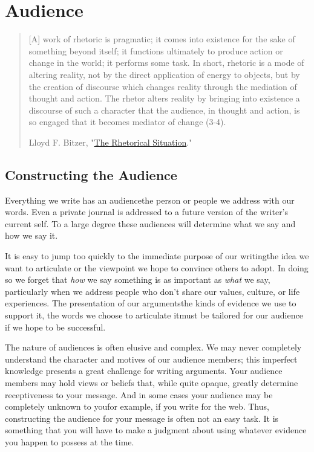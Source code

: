 \hypertarget{audience}{}

\chapter{Audience}

\begin{quote} \small [A] work of rhetoric is pragmatic; it comes into existence
for the sake of something beyond itself; it functions ultimately to produce
action or change in the world; it performs some task. In short, rhetoric is a
mode of altering reality, not by the direct application of energy to objects,
but by the creation of discourse which changes reality through the mediation of
thought and action. The rhetor alters reality by bringing into existence a
discourse of such a character that the audience, in thought and action, is so
engaged that it becomes mediator of change (3-4).

\textemdash Lloyd F. Bitzer, "\href{http://www.jstor.org/stable/40593346}{The
Rhetorical Situation}." \end{quote}

\section{Constructing the Audience}

Everything we write has an audience\textemdash the person or people we address
with our words. Even a private journal is addressed to a future version of the
writer's current self. To a large degree these audiences will determine what we say and how we say it.

It is easy to jump too quickly to the immediate purpose of our
writing\textemdash the idea we want to articulate or the viewpoint we hope to
convince others to adopt. In doing so we forget that \emph{how} we say
something is as important as \emph{what} we say, particularly when we address
people who don't share our values, culture, or life experiences. The presentation of our
arguments\textemdash the kinds of evidence we use to support it, the words we
choose to articulate it\textemdash must be tailored for our audience if we hope
to be successful.

The nature of audiences is often elusive and complex. We may never completely understand the character and motives of our audience members; this imperfect knowledge presents a great challenge for writing arguments. Your audience members may hold views or beliefs that, while quite opaque, greatly determine receptiveness to your message. And in some cases your audience may be completely unknown to you\textemdash for example, if you write for the web. Thus, constructing the audience for your message is often not an easy task. It is something that you will have to make a judgment about using whatever evidence you happen to possess at the time. 

